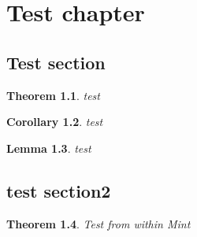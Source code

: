 \documentclass{book}
\newtheorem{theo}{Theorem}[section]
\newtheorem{lemm}[theo]{Lemma}
\newtheorem{coro}[theo]{Corollary}
\begin{document}
\chapter{Test chapter}
\section{Test section}

\begin{theo}
test
\end{theo}

\begin{coro}
test
\end{coro}

\begin{lemm}
test
\end{lemm}

\section{test section2}

\begin{theo} Test from within Mint\end{theo}
\end{document}
